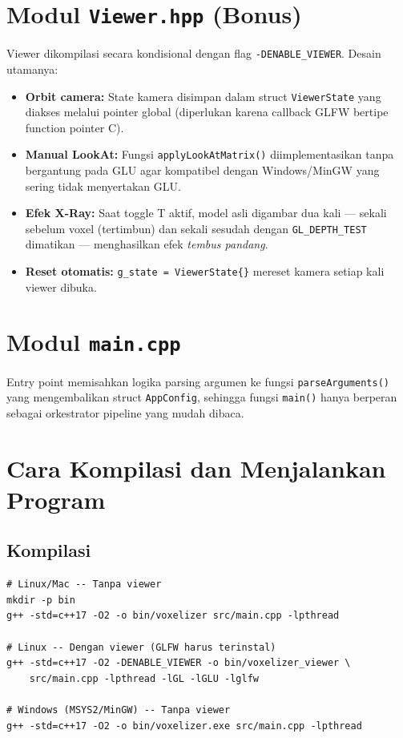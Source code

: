 \documentclass[12pt, a4paper]{report}
\begin{document}
\section{Modul \texttt{Viewer.hpp} (Bonus)}

Viewer dikompilasi secara kondisional dengan flag
\texttt{-DENABLE\_VIEWER}. Desain utamanya:

\begin{itemize}
  \item \textbf{Orbit camera:} State kamera disimpan dalam struct
        \texttt{ViewerState} yang diakses melalui pointer global
        (diperlukan karena callback GLFW bertipe function pointer C).
  \item \textbf{Manual LookAt:} Fungsi \texttt{applyLookAtMatrix()}
        diimplementasikan tanpa bergantung pada GLU agar kompatibel
        dengan Windows/MinGW yang sering tidak menyertakan GLU.
  \item \textbf{Efek X-Ray:} Saat toggle T aktif, model asli digambar
        dua kali — sekali sebelum voxel (tertimbun) dan sekali sesudah
        dengan \texttt{GL\_DEPTH\_TEST} dimatikan — menghasilkan efek
        \textit{tembus pandang}.
  \item \textbf{Reset otomatis:} \texttt{g\_state = ViewerState\{\}}
        mereset kamera setiap kali viewer dibuka.
\end{itemize}

\section{Modul \texttt{main.cpp}}

Entry point memisahkan logika parsing argumen ke fungsi
\texttt{parseArguments()} yang mengembalikan struct \texttt{AppConfig},
sehingga fungsi \texttt{main()} hanya berperan sebagai orkestrator
pipeline yang mudah dibaca.

\section{Cara Kompilasi dan Menjalankan Program}

\subsection{Kompilasi}

\begin{lstlisting}[style=pseudocode, numbers=none,
  caption={Cara kompilasi program}]
# Linux/Mac -- Tanpa viewer
mkdir -p bin
g++ -std=c++17 -O2 -o bin/voxelizer src/main.cpp -lpthread

# Linux -- Dengan viewer (GLFW harus terinstal)
g++ -std=c++17 -O2 -DENABLE_VIEWER -o bin/voxelizer_viewer \
    src/main.cpp -lpthread -lGL -lGLU -lglfw

# Windows (MSYS2/MinGW) -- Tanpa viewer
g++ -std=c++17 -O2 -o bin/voxelizer.exe src/main.cpp -lpthread
\end{lstlisting}
\end{document}
